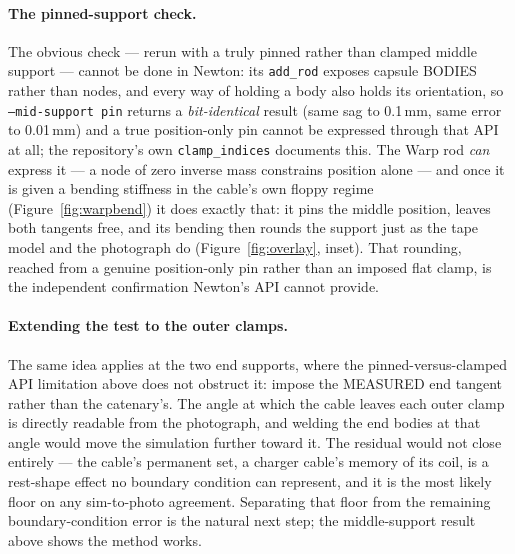 \documentclass[11pt,a4paper]{article}
\begin{document}
\paragraph{The pinned-support check.} The obvious check --- rerun with a truly
pinned rather than clamped middle support --- cannot be done in Newton: its
\texttt{add\_rod} exposes capsule BODIES rather than nodes, and every way of
holding a body also holds its orientation, so \texttt{--mid-support pin}
returns a \emph{bit-identical} result (same sag to 0.1\,mm, same error to
0.01\,mm) and a true position-only pin cannot be expressed through that API at
all; the repository's own \texttt{clamp\_indices} documents this. The Warp rod
\emph{can} express it --- a node of zero inverse mass constrains position
alone --- and once it is given a bending stiffness in the cable's own floppy
regime (Figure~\ref{fig:warpbend}) it does exactly that: it pins the middle
position, leaves both tangents free, and its bending then rounds the support
just as the tape model and the photograph do (Figure~\ref{fig:overlay}, inset).
That rounding, reached from a genuine position-only pin rather than an imposed
flat clamp, is the independent confirmation Newton's API cannot provide.

\paragraph{Extending the test to the outer clamps.} The same idea applies at
the two end supports, where the pinned-versus-clamped API limitation above does
not obstruct it: impose the MEASURED end tangent rather than the catenary's. The
angle at which the cable leaves each outer clamp is directly readable from the
photograph, and welding the end bodies at that angle would move the simulation
further toward it. The residual would not close entirely --- the cable's
permanent set, a charger cable's memory of its coil, is a rest-shape effect no
boundary condition can represent, and it is the most likely floor on any
sim-to-photo agreement. Separating that floor from the remaining
boundary-condition error is the natural next step; the middle-support result
above shows the method works.
\end{document}
